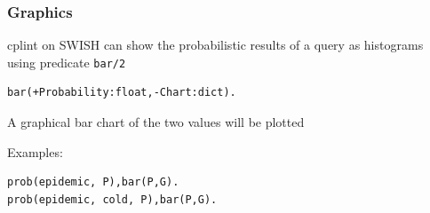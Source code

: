 \documentclass[trans]{beamer}
\begin{document}
\begin{frame}[fragile]
  \frametitle{Graphics}
cplint on SWISH can show the probabilistic results of a query as histograms using predicate \verb|bar/2|
\begin{verbatim}
bar(+Probability:float,-Chart:dict).
\end{verbatim}
A graphical bar chart of the two values will be plotted

Examples:
\begin{verbatim}
prob(epidemic, P),bar(P,G).
prob(epidemic, cold, P),bar(P,G).
\end{verbatim}
\end{frame}
\end{document}
